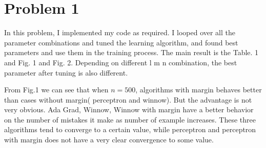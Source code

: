 
\usepackage{amsmath,amssymb,url,color,multirow,array,graphicx}
\sloppy
\newcommand{\ignore}[1]{}
\oddsidemargin 0in
\evensidemargin 0in
\textwidth 6.5in
\topmargin -0.5in
\textheight 9.0in




\pagestyle{myheadings}  %

\section{Problem 1}
In this problem, I implemented my code as required. I looped over all the parameter combinations and tuned the learning algorithm, and found best parameters and use them in the training process. The main result is the Table. 1 and Fig. 1 and Fig. 2. Depending on different l m n combination, the best parameter after tuning is also different. 

\noindent From Fig.1 we can see that when $n=500$, algorithms with margin behaves better than cases without margin( perceptron and winnow). But the advantage is not very obvious. Ada Grad, Winnow, Winnow with margin have a better behavior on the number of mistakes it make as number of example increases. These three algorithms tend to converge to a certain value, while perceptron and perceptron with margin does not have a very clear convergence to some value. 


